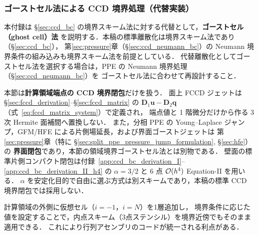 \subsubsection{ゴーストセル法による CCD 境界処理（代替実装）}
\label{app:ccd_ghost}

本付録は §\ref{sec:ccd_bc} の境界スキーム法に対する代替として，\textbf{ゴーストセル（ghost cell）法}
を説明する．本稿の標準離散化は境界スキーム法であり（§\ref{sec:ccd_bc}），
第\ref{sec:pressure}章（§\ref{sec:ccd_neumann_bc}）の Neumann 境界条件の組み込みも境界スキーム法を前提としている．
代替離散化としてゴーストセル法を選択する場合は，PPE の Neumann 境界処理（§\ref{sec:ccd_neumann_bc}）を
ゴーストセル法に合わせて再設計すること．

\begin{tcolorbox}[warnbox, title={本付録 C.2 の適用範囲}]
本節は\textbf{計算領域端点の CCD 境界閉包}だけを扱う．
面上 FCCD ジェットは §\ref{sec:fccd_derivation}--§\ref{sec:fccd_matrix} の
$\mathbf{D}_1\mathbf{u}-\mathbf{D}_2\mathbf{q}$（式~\eqref{eq:fccd_matrix_system}）で定義され，
端点値と 1 階微分だけから作る 3 次 Hermite 面補間へ置換しない．
また，分相 PPE の Young--Laplace ジャンプ，GFM/HFE による片側場延長，および界面ゴーストジェットは
第\ref{sec:pressure}章（特に §\ref{sec:split_ppe_pressure_jump_formulation}, §\ref{sec:hfe}）の
\textbf{界面閉包}であり，本節の領域境界ゴーストセル法とは別物である．
壁面の標準片側コンパクト閉包は付録~\ref{app:ccd_bc_derivation_I}--\ref{app:ccd_bc_derivation_II_h4} の
$\alpha=3/2$ と 6 点 $\mathcal{O}(h^4)$ Equation-II を用いる．
$\alpha$ を安定化目的で自由に選ぶ方式は別スキームであり，本稿の標準 CCD 境界閉包では採用しない．
\end{tcolorbox}

計算領域の外側に仮想セル（$i = -1$，$i = N$）を1層追加し，
境界条件に応じた値を設定することで，内点スキーム（3点ステンシル）を境界近傍でもそのまま適用できる．
これにより行列アセンブリのコードが統一される利点がある．

